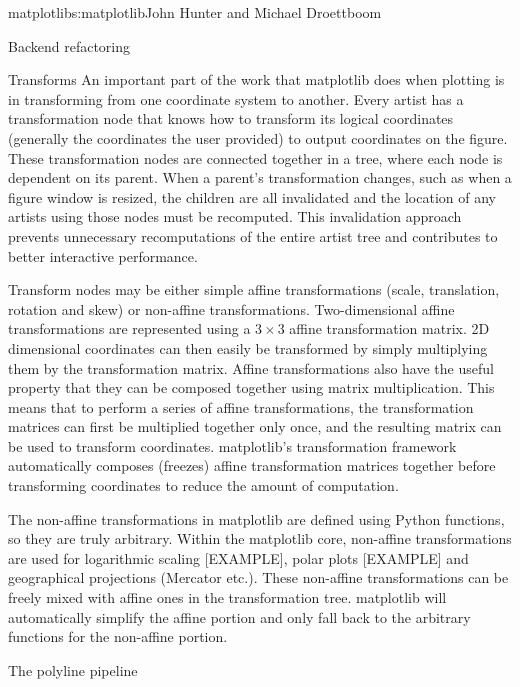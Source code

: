 \begin{aosachapter}{matplotlib}{s:matplotlib}{John Hunter and Michael Droettboom}
\begin{aosasect1}{Backend refactoring}
\end{aosasect1}

\begin{aosasect1}{Transforms}
An important part of the work that matplotlib does when plotting is in
transforming from one coordinate system to another.  Every artist has
a transformation node that knows how to transform its logical
coordinates (generally the coordinates the user provided) to output
coordinates on the figure.  These transformation nodes are connected
together in a tree, where each node is dependent on its parent.  When
a parent's transformation changes, such as when a figure window is
resized, the children are all invalidated and the location of any
artists using those nodes must be recomputed.  This invalidation
approach prevents unnecessary recomputations of the entire artist tree
and contributes to better interactive performance.

Transform nodes may be either simple affine transformations (scale,
translation, rotation and skew) or non-affine transformations.
Two-dimensional affine transformations are represented using a $3
\times 3$ affine transformation matrix.  2D dimensional coordinates can
then easily be transformed by simply multiplying them by the
transformation matrix.  Affine transformations also have the useful
property that they can be composed together using matrix
multiplication.  This means that to perform a series of affine
transformations, the transformation matrices can first be multiplied
together only once, and the resulting matrix can be used to transform
coordinates.  matplotlib's transformation framework automatically
composes (freezes) affine transformation matrices together before
transforming coordinates to reduce the amount of computation.

The non-affine transformations in matplotlib are defined using Python
functions, so they are truly arbitrary.  Within the matplotlib core,
non-affine transformations are used for logarithmic scaling [EXAMPLE],
polar plots [EXAMPLE] and geographical projections (Mercator etc.).
These non-affine transformations can be freely mixed with affine ones
in the transformation tree.  matplotlib will automatically simplify
the affine portion and only fall back to the arbitrary functions for
the non-affine portion.


\end{aosasect1}

\begin{aosasect1}{The polyline pipeline}


\end{aosasect1}
\end{aosachapter}

